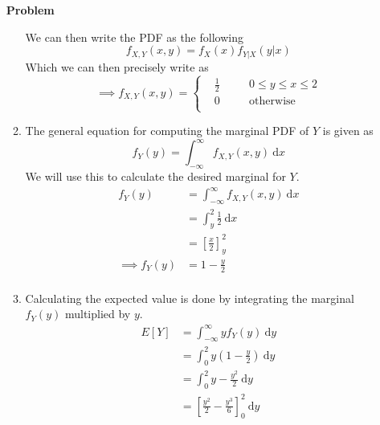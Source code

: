 \documentclass[12pt]{article}
\newenvironment{Ex}{\textbf{Problem}\vspace{.75em}\\}{}
\newcommand{\dd}[1]{\:\mathrm{d}{#1}}
\begin{document}
\begin{enumerate}
\begin{Ex}
\begin{solution}
\begin{enumerate}
        We can then write the PDF as the following
        \begin{equation}
          \label{eq:3a-presol}
          f_{X,Y}(x,y) = f_X(x)f_{Y|X}(y|x)
        \end{equation}
        Which we can then precisely write as
        \begin{equation}
          \label{eq:3a-sol}
          \implies f_{X,Y}(x,y) = \left\{
            \begin{aligned}
              & \frac{1}{2} && \quad 0 \le y \le x \le 2 \\
              & 0 &&\quad\text{otherwise} \\
            \end{aligned} \right.
        \end{equation}
      \item The general equation for computing the marginal PDF of $Y$
        is given as
        \begin{equation}
          \label{eq:3b-general-marginal}
          f_Y(y) = \int_{-\infty}^{\infty} f_{X,Y}(x,y) \dd{x}
        \end{equation}
        We will use this to calculate the desired marginal for $Y$.
        \begin{equation}
          \label{eq:3b-sol}
          \begin{aligned}
            f_Y(y) &= \int_{-\infty}^{\infty} f_{X,Y}(x,y) \dd{x} \\
            &= \int_{y}^{2} \frac{1}{2} \dd{x} \\
            &= \left[\frac{x}{2}\right]_y^2 \\
            \implies f_Y(y) &= 1 - \frac{y}{2} \\
          \end{aligned}
        \end{equation}
      \item Calculating the expected value is done by integrating the
        marginal $f_Y(y)$ multiplied by $y$.
        \begin{equation}
          \label{eq:3c-sol}
          \begin{aligned}
            E[Y] &= \int_{-\infty}^{\infty} y f_Y(y) \dd{y} \\
            &= \int_{0}^{2} y\left(1-\frac{y}{2}\right) \dd{y} \\
            &= \int_{0}^{2} y-\frac{y^2}{2} \dd{y} \\
            &= \left[\frac{y^2}{2}-\frac{y^3}{6}\right]_{0}^{2}
            \dd{y} \\

\end{aligned}
\end{equation}
\end{enumerate}
\end{solution}
\end{Ex}
\end{enumerate}
\end{document}

